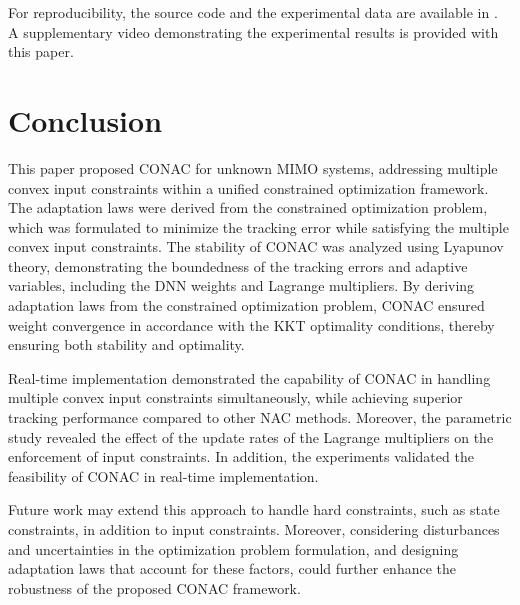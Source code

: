 \documentclass[letterpaper, journal]{IEEEtran}
\begin{document}
For reproducibility, the source code and the experimental data are available in \cite{Ryu2026Software}.
A supplementary video demonstrating the experimental results is provided with this paper.

\section{Conclusion} \label{sec:conclusion}

This paper proposed CONAC for unknown MIMO systems, addressing multiple convex input constraints within a unified constrained optimization framework. 
The adaptation laws were derived from the constrained optimization problem, which was formulated to minimize the tracking error while satisfying the multiple convex input constraints.
The stability of CONAC was analyzed using Lyapunov theory, demonstrating the boundedness of the tracking errors and adaptive variables, including the DNN weights and Lagrange multipliers.
By deriving adaptation laws from the constrained optimization problem, CONAC ensured weight convergence in accordance with the KKT optimality conditions, thereby ensuring both stability and optimality.

Real-time implementation demonstrated the capability of CONAC in handling multiple convex input constraints simultaneously, while achieving superior tracking performance compared to other NAC methods.
Moreover, the parametric study revealed the effect of the update rates of the Lagrange multipliers on the enforcement of input constraints.
In addition, the experiments validated the feasibility of CONAC in real-time implementation.

Future work may extend this approach to handle hard constraints, such as state constraints, in addition to input constraints.
Moreover, considering disturbances and uncertainties in the optimization problem formulation, and designing adaptation laws that account for these factors, could further enhance the robustness of the proposed CONAC framework.



% 

\end{document}
